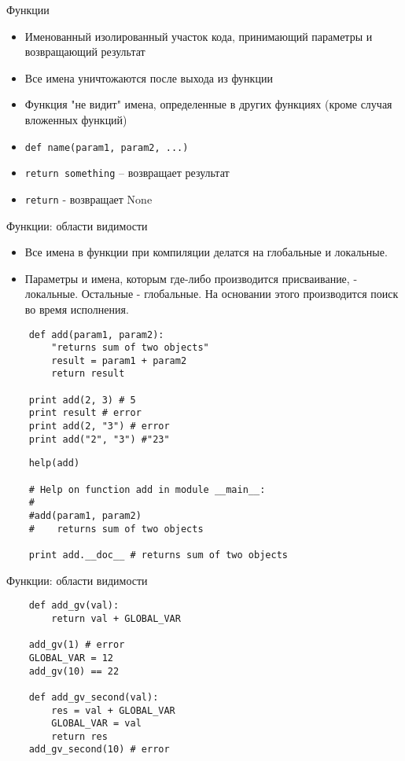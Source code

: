 \documentclass{article}
\begin{document}
\LARGE

{\center Функции}
\begin{itemize}
    \item Именованный изолированный участок кода,
        принимающий параметры и возвращающий результат
    \item Все имена уничтожаются после выхода из функции
    \item Функция "не видит" имена, определенные в других 
        функциях (кроме случая вложенных функций)
    \item \lstinline!def name(param1, param2, ...)!
    \item \lstinline!return something! – возвращает результат
    \item \lstinline!return! - возвращает None
\end{itemize}
\newpage

{\center Функции: области видимости}
\begin{itemize}
    \item Все имена в функции при компиляции делатся на глобальные и локальные.
    \item Параметры и имена, которым где-либо производится присваивание, - локальные.
          Остальные - глобальные. На основании этого производится поиск во время исполнения.
\end{itemize}
\vspace{15pt}
\begin{lstlisting}
    def add(param1, param2):
        "returns sum of two objects"
        result = param1 + param2
        return result

    print add(2, 3) # 5
    print result # error
    print add(2, "3") # error
    print add("2", "3") #"23"
\end{lstlisting}
\newpage

\vspace{15pt}
\begin{lstlisting}
    help(add)
    
    # Help on function add in module __main__:
    #
    #add(param1, param2)
    #    returns sum of two objects

    print add.__doc__ # returns sum of two objects
\end{lstlisting}
\newpage

{\center Функции: области видимости}
\vspace{15pt}
\begin{lstlisting}
    def add_gv(val):
        return val + GLOBAL_VAR

    add_gv(1) # error
    GLOBAL_VAR = 12
    add_gv(10) == 22

    def add_gv_second(val):
        res = val + GLOBAL_VAR
        GLOBAL_VAR = val
        return res
    add_gv_second(10) # error
\end{lstlisting}
\newpage
\end{document}
